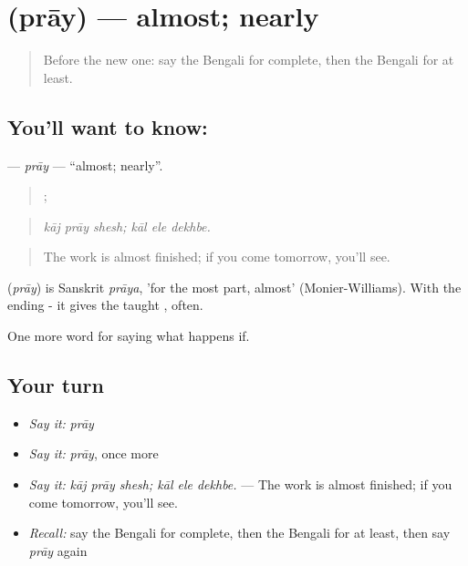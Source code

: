 \section[\texorpdfstring{\bn{প্রায়} (prāy)}{প্রায় (prāy)}]{ (prāy) — almost; nearly}

\label{lesson:BN-C373-pray}



\begin{quote}
Before the new one: say the Bengali for complete, then the Bengali for at least.
\end{quote}

\subsection*{You'll want to know: }
\textbf{} — \emph{prāy} — \textquotedblleft{}almost; nearly\textquotedblright{}.

\begin{quote}
  ;   
\end{quote}

\begin{quote}
\emph{kāj prāy shesh; kāl ele dekhbe.}
\end{quote}

\begin{quote}
The work is almost finished; if you come tomorrow, you'll see.
\end{quote}

\begin{cousinweb}
\textbf{} (\emph{prāy}) is Sanskrit \emph{prāya}, 'for the most part, almost' (Monier-Williams). With the ending - it gives the taught , often.
\end{cousinweb}

\begin{grammarlens}[title={What you've built}]
One more word for saying what happens if.
\end{grammarlens}

\subsection*{Your turn}
\begin{itemize}
\raggedright
  \item \emph{Say it:} \emph{prāy}
  \item \emph{Say it:} \emph{prāy}, once more
  \item \emph{Say it:} \emph{kāj prāy shesh; kāl ele dekhbe.} — The work is almost finished; if you come tomorrow, you'll see.
  \item \emph{Recall:} say the Bengali for complete, then the Bengali for at least, then say \emph{prāy} again
\end{itemize}

